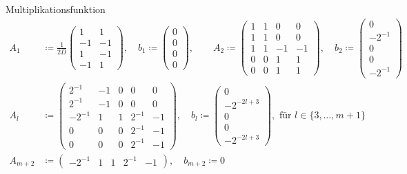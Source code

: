 \documentclass[10pt,aspectratio=169]{beamer}
\newcommand{\set}[1]{\{#1\}}
\begin{document}
\begin{frame}{Multiplikationsfunktion}
    \begin{align*}
        A_1 &\coloneqq \frac{1}{2D} \begin{pmatrix}
            1 & 1 \\ -1 & -1 \\ 1 & -1 \\ -1 & 1
        \end{pmatrix}, \quad b_1 \coloneqq \begin{pmatrix}
            0 \\ 0 \\ 0 \\ 0
        \end{pmatrix}, \qquad
        A_2 \coloneqq \begin{pmatrix}
            1 & 1 & 0 & 0 \\
            1 & 1 & 0 & 0 \\
            1 & 1 & -1 & -1 \\
            0 & 0 & 1 & 1 \\
            0 & 0 & 1 & 1
        \end{pmatrix}, \quad b_2 \coloneqq \begin{pmatrix}
            0 \\ -2^{-1} \\ 0 \\ 0 \\ -2^{-1}
        \end{pmatrix} \\
        A_l &\coloneqq \begin{pmatrix}
            2^{-1} & -1 & 0 & 0 & 0 \\
            2^{-1} & -1 & 0 & 0 & 0 \\
            -2^{-1} & 1 & 1 & 2^{-1} & -1 \\
            0 & 0 & 0 & 2^{-1} & -1 \\
            0 & 0 & 0 & 2^{-1} & -1
        \end{pmatrix}, \quad b_l \coloneqq \begin{pmatrix}
            0 \\ -2^{-2l+3} \\ 0 \\ 0 \\ -2^{-2l+3}
        \end{pmatrix}, \text{ für } l \in \set{3, \ldots, m+1} \\
        A_{m+2} &\coloneqq \begin{pmatrix}
            -2^{-1} & 1 & 1 & 2^{-1} & -1
        \end{pmatrix}, \quad b_{m+2} \coloneqq 0
    \end{align*}
\end{frame}
\end{document}
